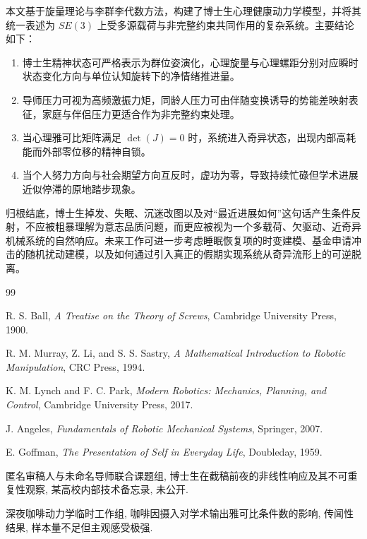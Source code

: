 \documentclass[UTF8,twocolumn,a4paper]{ctexart}
\begin{document}
本文基于旋量理论与李群李代数方法，构建了博士生心理健康动力学模型，并将其统一表述为 $SE(3)$ 上受多源载荷与非完整约束共同作用的复杂系统。主要结论如下：

\begin{enumerate}
  \item 博士生精神状态可严格表示为群位姿演化，心理旋量与心理螺距分别对应瞬时状态变化方向与单位认知旋转下的净情绪推进量。
  \item 导师压力可视为高频激振力矩，同龄人压力可由伴随变换诱导的势能差映射表征，家庭与伴侣压力更适合作为非完整约束处理。
  \item 当心理雅可比矩阵满足 $\det(J)=0$ 时，系统进入奇异状态，出现内部高耗能而外部零位移的精神自锁。
  \item 当个人努力方向与社会期望方向互反时，虚功为零，导致持续忙碌但学术进展近似停滞的原地踏步现象。
\end{enumerate}

归根结底，博士生掉发、失眠、沉迷改图以及对“最近进展如何”这句话产生条件反射，不应被粗暴理解为意志品质问题，而更应被视为一个多载荷、欠驱动、近奇异机械系统的自然响应。未来工作可进一步考虑睡眠恢复项的时变建模、基金申请冲击的随机扰动建模，以及如何通过引入真正的假期实现系统从奇异流形上的可逆脱离。

\begin{thebibliography}{99}

R. S. Ball,
\newblock \emph{A Treatise on the Theory of Screws},
\newblock Cambridge University Press, 1900.

R. M. Murray, Z. Li, and S. S. Sastry,
\newblock \emph{A Mathematical Introduction to Robotic Manipulation},
\newblock CRC Press, 1994.

K. M. Lynch and F. C. Park,
\newblock \emph{Modern Robotics: Mechanics, Planning, and Control},
\newblock Cambridge University Press, 2017.

J. Angeles,
\newblock \emph{Fundamentals of Robotic Mechanical Systems},
\newblock Springer, 2007.

E. Goffman,
\newblock \emph{The Presentation of Self in Everyday Life},
\newblock Doubleday, 1959.

匿名审稿人与未命名导师联合课题组,
\newblock 博士生在截稿前夜的非线性响应及其不可重复性观察,
\newblock 某高校内部技术备忘录, 未公开.

深夜咖啡动力学临时工作组,
\newblock 咖啡因摄入对学术输出雅可比条件数的影响,
\newblock 传闻性结果, 样本量不足但主观感受极强.

\end{thebibliography}
\end{document}
